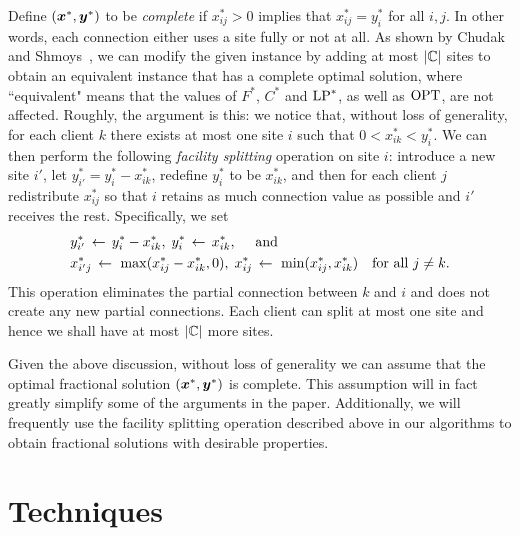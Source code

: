 \documentclass[oneside,final]{ucr}
\begin{document}
Define $(\boldsymbol{x}^\ast, \boldsymbol{y}^\ast)$ to be \emph{complete} if
$x_{ij}^\ast>0$ implies that $x_{ij}^\ast=y_i^\ast$ for all
$i,j$. In other words, each connection either uses a site
fully or not at all.  As shown by Chudak and
Shmoys~\cite{ChudakS04}, we can modify the given instance by
adding at most $|\mathbb{C}|$ sites to obtain an equivalent
instance that has a complete optimal solution, where
``equivalent" means that the values of $F^\ast$, $C^\ast$
and $\mbox{\rm LP}^\ast$, as well as $\mbox{\rm OPT}$, are not
affected. Roughly, the argument is this: we notice that,
without loss of generality, for each client $k$ there exists
at most one site $i$ such that $0 < x_{ik}^\ast < y_i^\ast$.
We can then perform the following \emph{facility splitting}
operation on site $i$: introduce a new site $i'$, let
$y^\ast_{i'} = y^\ast_i - x^\ast_{ik}$, redefine $y^\ast_i$
to be $x^\ast_{ik}$, and then for each client $j$
redistribute $x^\ast_{ij}$ so that $i$ retains as much
connection value as possible and $i'$ receives the
rest. Specifically, we set
%
\begin{align*}
  &y^\ast_{i'} \;{\,\leftarrow\,}\; y^\ast_i - x^\ast_{ik},\;   y^\ast_{i} \;{\,\leftarrow\,}\; x^\ast_{ik}, \quad \text{ and }\\
  &x^\ast_{i'j} \;{\,\leftarrow\,}\;\max( x^\ast_{ij} - x^\ast_{ik}, 0 ),\;	 x^\ast_{ij} \;{\,\leftarrow\,}\; \min( x^\ast_{ij} , x^\ast_{ik}) 
			\quad	\textrm{for all}\ j \neq k.
\end{align*}
%
This operation eliminates the partial connection between $k$
and $i$ and does not create any new partial
connections. Each client can split at most one site and
hence we shall have at most $|\mathbb{C}|$ more sites.

Given the above discussion, without loss of generality we
can assume that the optimal fractional solution $(\boldsymbol{x}^\ast,
\boldsymbol{y}^\ast)$ is complete. This assumption will in fact
greatly simplify some of the arguments in the
paper. Additionally, we will frequently use the facility
splitting operation described above in our algorithms to
obtain fractional solutions with desirable properties.

\chapter{Techniques} \label{ch: techniques} 
\end{document}
